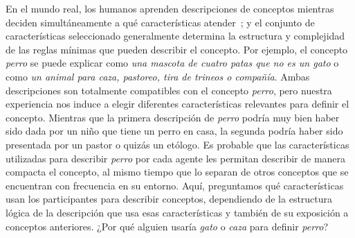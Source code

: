 En el mundo real, los humanos aprenden descripciones de conceptos mientras deciden simultáneamente a qué características atender~\cite{schyns1998development}; y el conjunto de características seleccionado generalmente determina la estructura y complejidad de las reglas mínimas que pueden describir el concepto. Por ejemplo, el concepto \textit{perro} se puede explicar como {\em una mascota de cuatro patas que no es un gato} o como {\em un animal para caza, pastoreo, tira de trineos o compañía}. Ambas descripciones son totalmente compatibles con el concepto \textit{perro}, pero nuestra experiencia nos induce a elegir diferentes características relevantes para definir el concepto. Mientras que la primera descripción de {\em perro} podría muy bien haber sido dada por un niño que tiene un perro en casa, la segunda podría haber sido presentada por un pastor o quizás un etólogo. Es probable que las características utilizadas para describir {\em perro} por cada agente les permitan describir de manera compacta el concepto, al mismo tiempo que lo separan de otros conceptos que se encuentran con frecuencia en su entorno. Aquí, preguntamos qué características usan los participantes para describir conceptos, dependiendo de la estructura lógica de la descripción que usa esas características y también de su exposición a conceptos anteriores. ¿Por qué alguien usaría {\em gato} o {\em caza} para definir {\em perro}?
